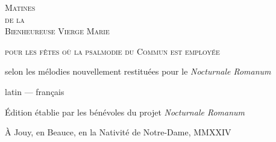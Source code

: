 \documentclass[nocturnal_bvm_fr.tex]{subfiles}
\begin{document}
\null

\vfill
\begin{center}
{\Huge \textsc{Matines\\de la\\Bienheureuse Vierge Marie}}\par
\vspace{3cm}
{\large \textsc{pour les fêtes où la psalmodie du Commun est employée}}\par
\vspace{5cm}
{\large selon les mélodies nouvellement restituées pour le \emph{Nocturnale Romanum}}\par
\vspace{3cm}
{\large latin --- français}\par
\end{center}
\vfill

\begin{center}
{\footnotesize Édition établie par les bénévoles du projet \emph{Nocturnale Romanum}}

{\footnotesize À Jouy, en Beauce, en la Nativité de Notre-Dame, MMXXIV}
\end{center}
\end{document}
